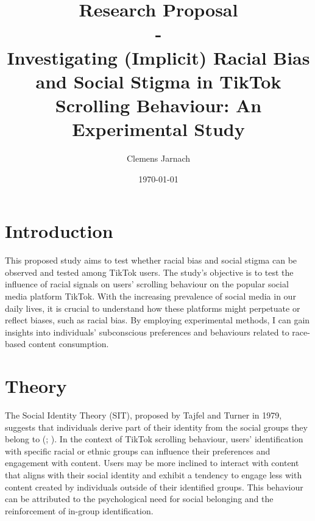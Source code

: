 \documentclass[a4paper, 12pt]{article}   %
\begin{document}

\title{Research Proposal \\
- \\
Investigating (Implicit) Racial Bias and Social Stigma in TikTok Scrolling Behaviour: An Experimental Study}     %
	 	
\author{Clemens Jarnach}	%
\date{\today}										%

\maketitle 											%




\section*{Introduction}
This proposed study aims to test whether racial bias and social stigma can be observed and tested among TikTok users. The study's objective is to test
the influence of racial signals on users' scrolling behaviour on the popular social media platform TikTok. With the increasing prevalence of social media in our daily lives, it is crucial to understand how these platforms might perpetuate or reflect biases, such as racial bias. By employing experimental methods, I can gain insights into individuals' subconscious preferences and behaviours related to race-based content consumption. 

\section*{Theory}
The Social Identity Theory (SIT), proposed by Tajfel and Turner in 1979, suggests that individuals derive part of their identity from the social groups they belong to (\cite{tajfelIntegrativeTheoryIntergroup1979}; \cite{TajfelHenri1981Hgas}). In the context of TikTok scrolling behaviour, users' identification with specific racial or ethnic groups can influence their preferences and engagement with content. Users may be more inclined to interact with content that aligns with their social identity and exhibit a tendency to engage less with content created by individuals outside of their identified groups. This behaviour can be attributed to the psychological need for social belonging and the reinforcement of in-group identification.
\end{document}
